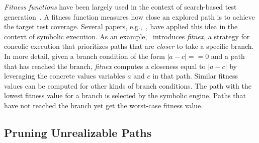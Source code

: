{\em Fitness functions} have been largely used in the context of search-based test generation~\cite{M-STVR04}. %
A fitness function measures how close an explored path is to achieve the target test coverage. Several papers, e.g.,~\cite{XTD-DSN09,CS-CACM13,XTD-DSN09}, have applied this idea in the context of symbolic execution. As an example,~\cite{XTD-DSN09} introduces {\em fitnex}, a strategy for concolic execution that prioritizes paths that are {\em closer} to take a specific branch. In more detail, given a branch condition of the form $|a - c| == 0$ and a path that has reached the branch, {\em fitnex} computes a closeness equal to $|a - c|$ by leveraging the concrete values  variables $a$ and $c$ in that path. Similar fitness values can be computed for other kinds of branch conditions. The path with the lowest fitness value for a branch is selected by the symbolic engine. Paths that have not reached the branch yet get the worst-case fitness value.

\subsection{Pruning Unrealizable Paths}
\label{ss:unrealizable-paths}

